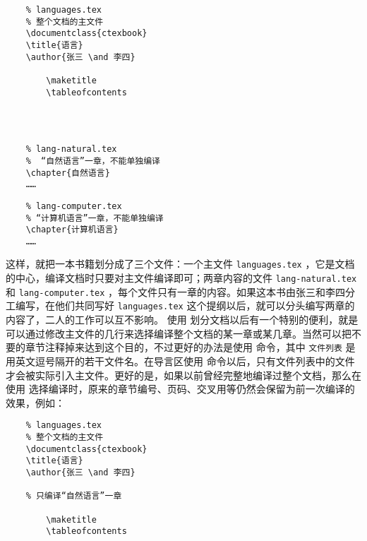 \begin{lstlisting}
    % languages.tex
    % 整个文档的主文件
    \documentclass{ctexbook}
    \title{语言}
    \author{张三 \and 李四}
    
        \maketitle
        \tableofcontents
        
        
    
\end{lstlisting}

\begin{lstlisting}
    % lang-natural.tex
    %  “自然语言”一章，不能单独编译
    \chapter{自然语言}
    ……
\end{lstlisting}

\begin{lstlisting}
    % lang-computer.tex
    % “计算机语言”一章，不能单独编译
    \chapter{计算机语言}
    ……
\end{lstlisting}

这样，就把一本书籍划分成了三个文件：一个主文件 \verb|languages.tex| ，它是文档的中心，编译文档时只要对主文件编译即可；两章内容的文件 \verb|lang-natural.tex| 和 \verb|lang-computer.tex| ，每个文件只有一章的内容。如果这本书由张三和李四分工编写，在他们共同写好 \verb|languages.tex| 这个提纲以后，就可以分头编写两章的内容了，二人的工作可以互不影响。
使用 \verb|| 划分文档以后有一个特别的便利，就是可以通过修改主文件的几行来选择编译整个文档的某一章或某几章。当然可以把不要的章节注释掉来达到这个目的，不过更好的办法是使用 \verb|| 命令，其中 \verb|文件列表| 是用英文逗号隔开的若干文件名。在导言区使用 \verb|| 命令以后，只有文件列表中的文件才会被实际引入主文件。更好的是，如果以前曾经完整地编译过整个文档，那么在使用 \verb||选择编译时，原来的章节编号、页码、交叉用等仍然会保留为前一次编译的效果，例如：

\begin{lstlisting}
    % languages.tex
    % 整个文档的主文件
    \documentclass{ctexbook}
    \title{语言}
    \author{张三 \and 李四}
    
    % 只编译“自然语言”一章
    
        \maketitle
        \tableofcontents
        
        
    
\end{lstlisting}

